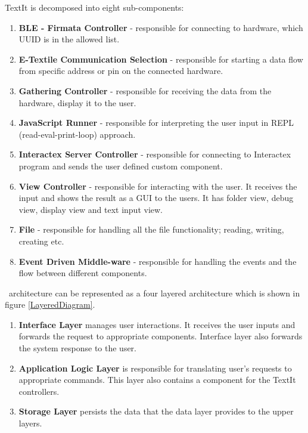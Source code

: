 

 TextIt is decomposed into eight sub-components:
\begin{enumerate}
\item \textbf{BLE - Firmata Controller} - responsible for connecting to hardware, which UUID is in the allowed list.
\item \textbf{E-Textile Communication Selection} - responsible for starting a data flow from specific address or pin on the connected hardware.
\item \textbf{Gathering Controller} - responsible for receiving the data from the hardware, display it to the user.
\item \textbf{JavaScript Runner} - responsible for interpreting the user input in REPL (read-eval-print-loop) approach. 
\item \textbf{Interactex Server Controller} - responsible for connecting to Interactex program and sends the user defined custom component.
\item \textbf{View Controller} - responsible for interacting with the user. It receives the input and shows the result as a GUI to the users. It has folder view, debug view, display view and text input view.
\item \textbf{File} - responsible for handling all the file functionality; reading, writing, creating etc.
\item \textbf{Event Driven Middle-ware} - responsible for handling the events and the flow between different components.

\end{enumerate}

\seif\ architecture can be represented as a four layered architecture which is shown in figure \ref{LayeredDiagram}. 


\begin{enumerate}
\item \textbf{Interface Layer} manages user interactions. It receives the user inputs and forwards the request to appropriate components. Interface layer also forwards the system response to the user.

\item \textbf{Application Logic Layer} is responsible for translating user's requests to appropriate commands. This layer also contains a component for the TextIt controllers.

\item \textbf{Storage Layer} persists the data that the data layer provides to the upper layers.

\end{enumerate}



